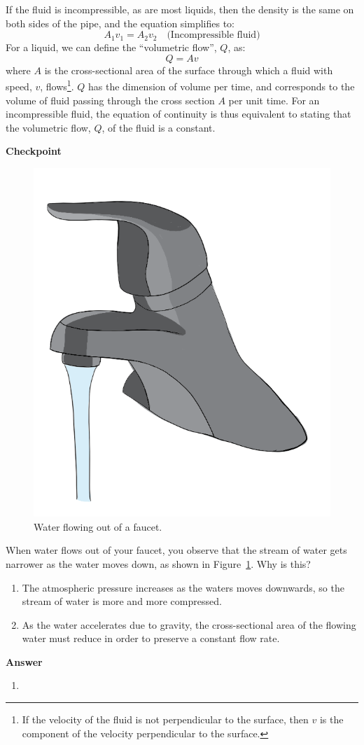 If the fluid is incompressible, as are most liquids, then the density is the same on both sides of the pipe, and the equation simplifies to:
\begin{equation}
\boxed{A_1 v_1 = A_2 v_2}\quad\text{(Incompressible fluid)}
\end{equation}
For a liquid, we can define the ``volumetric flow'', $Q$, as:
\begin{equation}
Q=Av
\end{equation}
where $A$ is the cross-sectional area of the surface through which a fluid with speed, $v$, flows\footnote{If the velocity of the fluid is not perpendicular to the surface, then $v$ is the component of the velocity perpendicular to the surface.}. $Q$ has the dimension of volume per time, and corresponds to the volume of fluid passing through the cross section $A$ per unit time. For an incompressible fluid, the equation of continuity is thus equivalent to stating that the volumetric flow, $Q$, of the fluid is a constant.

\begin{framed}
\textbf{Checkpoint}\\
\begin{figure}[!htbp]
\centering
\includegraphics[width=0.2\linewidth]{files/necking-9c723b4df639509caf658d10ea8c0700.png}
\caption[]{Water flowing out of a faucet.}
\label{fig:fluidmechanics:necking}
\end{figure}

When water flows out of your faucet, you observe that the stream of water gets narrower as the water moves down, as shown in Figure~\ref{fig:fluidmechanics:necking}. Why is this?

\begin{enumerate}
\item The atmospheric pressure increases as the waters moves downwards, so the stream of water is more and more compressed.
\item As the water accelerates due to gravity, the cross-sectional area of the flowing water must reduce in order to preserve a constant flow rate.
\end{enumerate}

\begin{framed}
\textbf{Answer}\\
\begin{enumerate}[resume]
\item
\end{enumerate}
\end{framed}
\end{framed}

